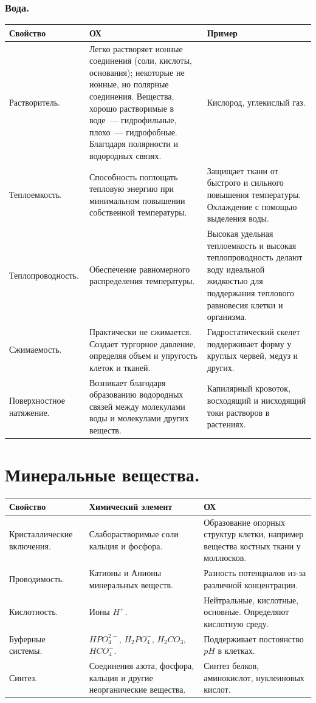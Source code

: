 \documentclass[12pt]{article}
\begin{document}
	\subsubsection{Вода.}
	\begin{xltabular}{\textwidth}{|p{3.5cm}|X|X|}
		\hline
		Свойство & ОХ & Пример \\
		\hline
		Растворитель. & Легко растворяет ионные соединения (соли, кислоты, основания); некоторые не ионные, но полярные соединения. Вещества, хорошо растворимые в воде~--- гидрофильные, плохо~--- гидрофобные. Благодаря полярности и водородных связях. & Кислород, углекислый газ. \\
		\hline
		Теплоемкость. & Способность поглощать тепловую энергию при минимальном повышении собственной температуры. & Защищает ткани от быстрого и сильного повышения температуры. Охлаждение с помощью выделения воды. \\
		\hline
		Теплопроводность. & Обеспечение равномерного распределения температуры. & Высокая удельная теплоемкость и высокая теплопроводность делают воду идеальной жидкостью для поддержания теплового равновесия клетки и организма. \\
		\hline
		Сжимаемость. & Практически не сжимается. Создает тургорное давление, определяя объем и упругость клеток и тканей. & Гидростатический скелет поддерживает форму у круглых червей, медуз и других. \\
		\hline
		Поверхностное натяжение. & Возникает благодаря образованию водородных связей между молекулами воды и молекулами других веществ. & Капилярный кровоток, восходящий и нисходящий токи растворов в растениях. \\
		\hline
	\end{xltabular}
	\section{Минеральные вещества.}
	\begin{xltabular}{\textwidth}{|X|X|X|}
		\hline
		Свойство & Химический элемент & ОХ \\
		\hline
		Кристаллические включения. & Слаборастворимые соли кальция и фосфора. & Образование опорных структур клетки, например вещества костных ткани у моллюсков. \\
		\hline
		Проводимость. & Катионы и Анионы минеральных веществ. & Разность потенциалов из-за различной концентрации. \\
		\hline
		Кислотность. & Ионы $H^+$. & Нейтральные, кислотные, основные. Определяют кислотную среду. \\
		\hline
		Буферные системы. & $HPO_4^{2-}$, $H_2PO_4^-$, $H_2CO_3$, $HCO_4^-$. & Поддерживает постоянство $pH$ в клетках. \\
		\hline
		Синтез. & Соединения азота, фосфора, кальция и другие неорганические вещества. & Синтез белков, аминокислот, нуклеиновых кислот. \\
		\hline
	\end{xltabular}
\end{document}
